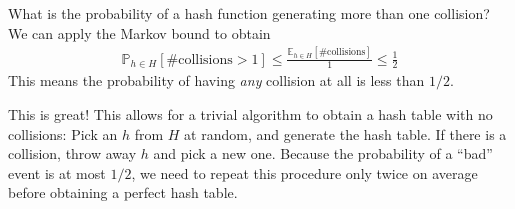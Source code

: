 \documentclass[11pt]{article}
\begin{document}
What is the probability of a hash function generating more than one collision? We can apply the Markov bound to obtain
%
\begin{align*}
	\mathbb{P}_{h\in H} [\text{\#collisions}>1] \leq \frac{\mathbb{E}_{h\in H} [\text{\#collisions}]}{1} \leq \frac{1}{2}
\end{align*}
%
This means the probability of having \emph{any} collision at all is less than $1/2$.

This is great! This allows for a trivial algorithm to obtain a hash table with no collisions: Pick an $h$ from $H$ at random, and generate the hash table. If there is a collision, throw away $h$ and pick a new one. Because the probability of a ``bad'' event is at most $1/2$, we need to repeat this procedure only twice on average before obtaining a perfect hash table.

\end{document}
